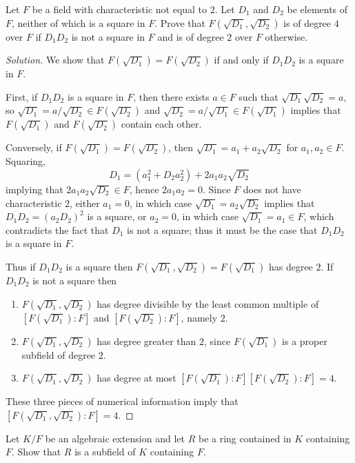 \documentclass[10pt]{article}
\providecommand{\ii}{\item}
\newenvironment{soln}{\begin{proof}[Solution]}{\end{proof}}
\begin{document}
\begin{problem}
    [\S13.2\#8]
    Let $F$ be a field with characteristic not equal to $2$.
    Let $D_1$ and $D_2$ be elements of $F$,
    neither of which is a square in $F$.
    Prove that $F(\sqrt{D_1}, \sqrt{D_2})$ is of degree $4$ over $F$
    if $D_1D_2$ is not a square in $F$ and is of degree $2$ over $F$ otherwise.
\end{problem}

\begin{soln}
    We show that $F(\sqrt{D_1}) = F(\sqrt{D_2})$
    if and only if $D_1D_2$ is a square in $F$.

    First, if $D_1D_2$ is a square in $F$, then
    there exists $a\in F$ such that
    $\sqrt{D_1}\sqrt{D_2} = a$, so
    $\sqrt{D_1} = a/\sqrt{D_2}\in F(\sqrt{D_2})$
    and $\sqrt{D_2} = a/\sqrt{D_1}\in F(\sqrt{D_1})$
    implies that $F(\sqrt{D_1})$ and $F(\sqrt{D_2})$ contain each other.

    Conversely, if $F(\sqrt{D_1}) = F(\sqrt{D_2})$,
    then $\sqrt{D_1} = a_1 + a_2\sqrt{D_2}$
    for $a_1,a_2\in F$. Squaring,
    \begin{equation*}
	D_1 = (a_1^2 + D_2a_2^2) + 2a_1a_2\sqrt{D_2}
    \end{equation*}
    implying that $2a_1a_2\sqrt{D_2}\in F$,
    hence $2a_1a_2 = 0$. Since $F$ does not have characteristic $2$,
    either $a_1 = 0$, in which case $\sqrt{D_1} = a_2\sqrt{D_2}$
    implies that $D_1D_2 = (a_2D_2)^2$ is a square,
    or $a_2 = 0$, in which case $\sqrt{D_1} = a_1\in F$,
    which contradicts the fact that $D_1$ is not a square;
    thus it must be the case that $D_1D_2$ is a square in $F$.

    Thus if $D_1D_2$ is a square then
    $F(\sqrt{D_1},\sqrt{D_2}) = F(\sqrt{D_1})$
    has degree $2$. If $D_1D_2$ is not a square then
    \begin{enumerate}[(1)]
	\ii $F(\sqrt{D_1},\sqrt{D_2})$ has degree
	divisible by the least common multiple of
	$[F(\sqrt{D_1}) : F]$ and $[F(\sqrt{D_2}) : F]$, namely $2$.
	\ii $F(\sqrt{D_1},\sqrt{D_2})$ has degree greater than $2$,
	since $F(\sqrt{D_1})$ is a proper subfield of degree $2$.
	\ii $F(\sqrt{D_1},\sqrt{D_2})$ has degree at most
	$[F(\sqrt{D_1}) : F][F(\sqrt{D_2}) : F] = 4$.
    \end{enumerate}
    These three pieces of numerical information
    imply that $[F(\sqrt{D_1},\sqrt{D_2}) : F] = 4$.
\end{soln}

\begin{problem}
    [\S13.2\#16]
    Let $K/F$ be an algebraic extension
    and let $R$ be a ring contained in $K$ containing $F$.
    Show that $R$ is a subfield of $K$ containing $F$.
\end{problem}
\end{document}
